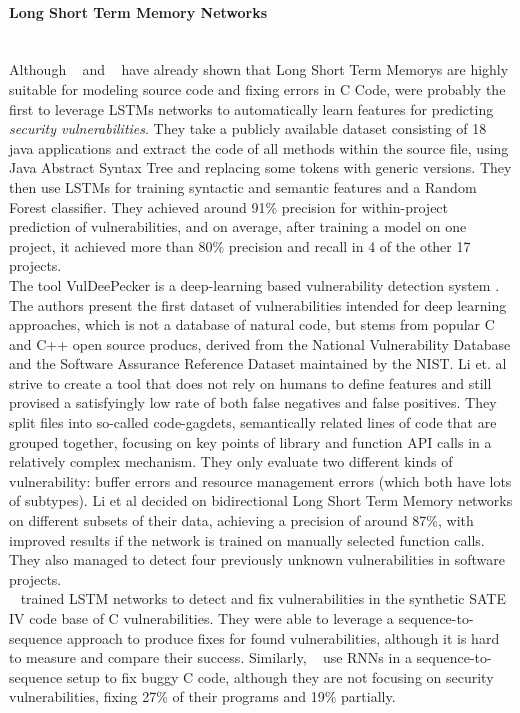 \documentclass[
	a4paper,
	pagesize,
	pdftex,
	12pt,
	twoside, %
	BCOR=5mm, %
	ngerman,
	fleqn,
	final,
	]{scrartcl}
\begin{document}
\paragraph{Long Short Term Memory Networks}\mbox{}\\
Although ~\cite{Gupta.2017b} and ~\cite{Dam.2016b} have already shown that Long Short Term Memorys are highly suitable for modeling source code and fixing errors in C Code, \cite{Dam.2017} were probably the first to leverage LSTMs networks to automatically learn features for predicting \textit{security vulnerabilities}. They take a publicly available dataset consisting of 18 java applications and extract the code of all methods within the source file, using Java Abstract Syntax Tree and replacing some tokens with generic versions. They then use LSTMs for training syntactic and semantic features and a Random Forest classifier. They achieved around 91\% precision for within-project prediction of vulnerabilities, and on average, after training a model on one project, it achieved more than 80\% precision and recall in 4 of the other 17 projects.\\
The tool VulDeePecker is a deep-learning based vulnerability detection system \cite{Li.2018}. The authors present the first dataset of vulnerabilities intended for deep learning approaches, which is not a database of natural code, but stems from popular C and C++ open source producs, derived from the National Vulnerability Database and the Software Assurance Reference Dataset maintained by the NIST. Li et. al strive to create a tool that does not rely on humans to define features and still provised a satisfyingly low rate of both false negatives and false positives. They split files into so-called code-gagdets, semantically related lines of code that are grouped together, focusing on key points of library and function API calls in a relatively complex mechanism. They only evaluate two different kinds of vulnerability: buffer errors and resource management errors (which both have lots of subtypes). Li et al decided on bidirectional Long Short Term Memory networks on different subsets of their data, achieving a precision of around 87\%, with improved results if the network is trained on manually selected function calls. They also managed to detect four previously unknown vulnerabilities in software projects. \\
~\cite{Harer.2018} trained LSTM networks to detect and fix vulnerabilities in the synthetic SATE IV code base of C vulnerabilities. They were able to leverage a sequence-to-sequence approach to produce fixes for found vulnerabilities, although it is hard to measure and compare their success. Similarly, ~\cite{Gupta.2017} use RNNs in a sequence-to-sequence setup to fix buggy C code, although they are not focusing on security vulnerabilities, fixing 27\% of their programs and 19\% partially.
\end{document}
